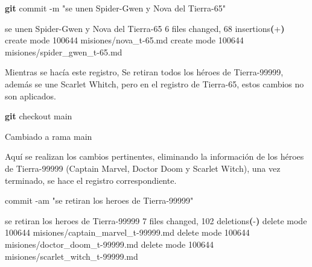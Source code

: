 \documentclass[
]{book}
\newenvironment{Shaded}{\begin{snugshade}}{\end{snugshade}}
\newcommand{\AttributeTok}[1]{\textcolor[rgb]{0.13,0.29,0.53}{#1}}
\newcommand{\ErrorTok}[1]{\textcolor[rgb]{0.64,0.00,0.00}{\textbf{#1}}}
\newcommand{\ExtensionTok}[1]{#1}
\newcommand{\FunctionTok}[1]{\textcolor[rgb]{0.13,0.29,0.53}{\textbf{#1}}}
\newcommand{\KeywordTok}[1]{\textcolor[rgb]{0.13,0.29,0.53}{\textbf{#1}}}
\newcommand{\NormalTok}[1]{#1}
\newcommand{\StringTok}[1]{\textcolor[rgb]{0.31,0.60,0.02}{#1}}
\begin{document}
\begin{Shaded}
\begin{Highlighting}[]
\FunctionTok{git}\NormalTok{ commit }\AttributeTok{{-}m} \StringTok{"se unen Spider{-}Gwen y Nova del Tierra{-}65"}
\end{Highlighting}
\end{Shaded}

\begin{Shaded}
\begin{Highlighting}[]
\ExtensionTok{[tierra{-}65}\NormalTok{ edf50e5] se unen Spider{-}Gwen y Nova del Tierra{-}65}
 \ExtensionTok{6}\NormalTok{ files changed, 68 insertions}\ErrorTok{(}\ExtensionTok{+}\KeywordTok{)}
 \ExtensionTok{create}\NormalTok{ mode 100644 misiones/nova\_t{-}65.md}
 \ExtensionTok{create}\NormalTok{ mode 100644 misiones/spider\_gwen\_t{-}65.md}
\end{Highlighting}
\end{Shaded}

Mientras se hacía este registro, Se retiran todos los héroes de Tierra-99999, además se une Scarlet Whitch, pero en el registro de Tierra-65, estos cambios no son aplicados.

\begin{Shaded}
\begin{Highlighting}[]
\FunctionTok{git}\NormalTok{ checkout main}
\end{Highlighting}
\end{Shaded}

\begin{Shaded}
\begin{Highlighting}[]
\NormalTok{Cambiado a rama \textquotesingle{}main\textquotesingle{}}
\end{Highlighting}
\end{Shaded}

Aquí se realizan los cambios pertinentes, eliminando la información de los héroes de Tierra-99999 (Captain Marvel, Doctor Doom y Scarlet Witch), una vez terminado, se hace el registro correspondiente.

\begin{Shaded}
\begin{Highlighting}[]
\ExtensionTok{commit} \AttributeTok{{-}am} \StringTok{"se retiran los heroes de Tierra{-}99999"}
\end{Highlighting}
\end{Shaded}

\begin{Shaded}
\begin{Highlighting}[]
\ExtensionTok{[main}\NormalTok{ 815d1e1] se retiran los heroes de Tierra{-}99999}
 \ExtensionTok{7}\NormalTok{ files changed, 102 deletions}\ErrorTok{(}\ExtensionTok{{-}}\KeywordTok{)}
 \ExtensionTok{delete}\NormalTok{ mode 100644 misiones/captain\_marvel\_t{-}99999.md}
 \ExtensionTok{delete}\NormalTok{ mode 100644 misiones/doctor\_doom\_t{-}99999.md}
 \ExtensionTok{delete}\NormalTok{ mode 100644 misiones/scarlet\_witch\_t{-}99999.md}
\end{Highlighting}
\end{Shaded}
\end{document}
